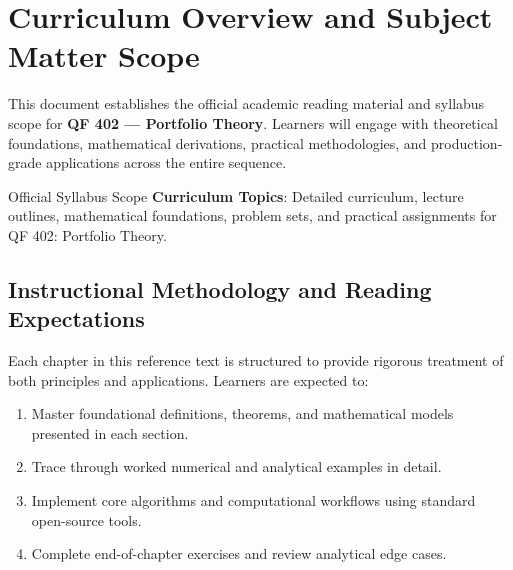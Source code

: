\section{Curriculum Overview and Subject Matter Scope}

This document establishes the official academic reading material and syllabus scope for \textbf{QF 402 --- Portfolio Theory}. Learners will engage with theoretical foundations, mathematical derivations, practical methodologies, and production-grade applications across the entire sequence.

\begin{InsightBox}{Official Syllabus Scope}
  \textbf{Curriculum Topics}: Detailed curriculum, lecture outlines, mathematical foundations, problem sets, and practical assignments for QF 402: Portfolio Theory.
\end{InsightBox}

\subsection{Instructional Methodology and Reading Expectations}

Each chapter in this reference text is structured to provide rigorous treatment of both principles and applications. Learners are expected to:
\begin{enumerate}
  \item Master foundational definitions, theorems, and mathematical models presented in each section.
  \item Trace through worked numerical and analytical examples in detail.
  \item Implement core algorithms and computational workflows using standard open-source tools.
  \item Complete end-of-chapter exercises and review analytical edge cases.
\end{enumerate}

